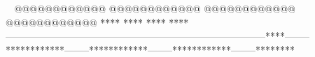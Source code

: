     @@@@@@@@@@@@        @@@@@@@@@@@@        @@@@@@@@@@@@        @@@@@@@@@@@@            ****                ****                ****                ****        --------------------------------------------------------------------------------****--------************--------************--------************--------********                                                                                